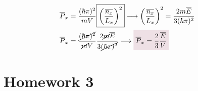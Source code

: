 \documentclass{article}
\begin{document}
\begin{problem}[Reif 2.7]
\begin{enumerate}[label=\alph*)]
\begin{align*}
                \\
                \overline{P}_x&=\frac{(\hbar\pi)^2}{mV}\boxed{\qty(\frac{\overline{n_x}}{L_x})^2}\longrightarrow \qty(\frac{\overline{n_x}}{L_x})^2=\frac{2m\overline{E}}{3(\hbar\pi)^2}
                \\
                \overline{P}_x&=\frac{\cancel{(\hbar\pi)^2}}{\cancel{m}V}\frac{2\cancel{m}\overline{E}}{3\cancel{(\hbar\pi)^2}}\longrightarrow\coloredanswer{\overline{P}_x=\frac{2}{3}\frac{\overline{E}}{V}}
            \end{align*}
        \end{enumerate}
    \end{problem}\newpage
\section{Homework 3}
\end{document}
